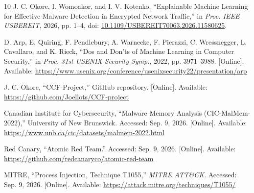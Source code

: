 \documentclass[conference]{IEEEtran}
\begin{document}
\begin{thebibliography}{10}
 J. C. Okore, I. Womoakor, and I. V. Kotenko,
``Explainable Machine Learning for Effective Malware Detection in Encrypted
Network Traffic,'' in \textit{Proc. IEEE USBEREIT}, 2026, pp. 1--4,
doi: \href{https://doi.org/10.1109/USBEREIT70063.2026.11580625}{10.1109/USBEREIT70063.2026.11580625}.

 D. Arp, E. Quiring, F. Pendlebury, A. Warnecke,
F. Pierazzi, C. Wressnegger, L. Cavallaro, and K. Rieck,
``Dos and Don'ts of Machine Learning in Computer Security,'' in
\textit{Proc. 31st USENIX Security Symp.}, 2022, pp. 3971--3988.
[Online]. Available:
\url{https://www.usenix.org/conference/usenixsecurity22/presentation/arp}

 J. C. Okore, ``CCF-Project,'' GitHub repository.
[Online]. Available:
\url{https://github.com/Joellots/CCF-project}

 Canadian Institute for Cybersecurity,
``Malware Memory Analysis (CIC-MalMem-2022),'' University of New Brunswick.
Accessed: Sep. 9, 2026. [Online]. Available:
\url{https://www.unb.ca/cic/datasets/malmem-2022.html}

 Red Canary, ``Atomic Red Team.''
Accessed: Sep. 9, 2026. [Online]. Available:
\url{https://github.com/redcanaryco/atomic-red-team}

 MITRE, ``Process Injection, Technique T1055,''
\textit{MITRE ATT\&CK}.
Accessed: Sep. 9, 2026. [Online]. Available:
\url{https://attack.mitre.org/techniques/T1055/}

\end{thebibliography}
\end{document}
